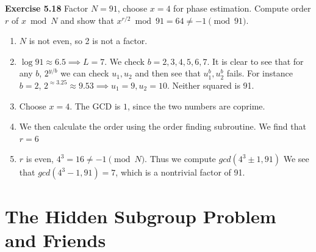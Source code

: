 \documentclass{article}
\begin{document}
\begin{tcolorbox} \textbf{Exercise 5.18} Factor $N = 91$, choose $x=4$ for phase estimation. Compute order $r$ of $x\bmod N$ and show that $x^{r/2} \bmod 91 = 64 \neq -1 \pmod{91}$.\\
	\begin{enumerate}
		\item $N$ is not even, so 2 is not a factor.
		\item $\log 91 \approx 6.5 \implies L = 7$. We check $b = 2,3,4,5,6,7$. It is clear to see that for any $b$, $2^{y/b}$ we can check $u_1, u_2$ and then see that $u_1^b, u_2^b$ fails. For instance $b=2$, $2^{\approx3.25} \approx 9.53 \implies u_1 =9, u_2 = 10.$ Neither squared is 91.  
		\item Choose $x=4$. The GCD is $1$, since the two numbers are coprime.
		\item We then calculate the order using the order finding subroutine. We find that $r=6$
		\item $r$ is even, $4^3 = 16 \neq -1 \pmod{N}$. Thus we compute $gcd(4^3\pm 1,91)$ We see that $gcd(4^3-1, 91)= 7$, which is a nontrivial factor of 91.
	\end{enumerate}
\end{tcolorbox}
\section{The Hidden Subgroup Problem and Friends}
\end{document}
